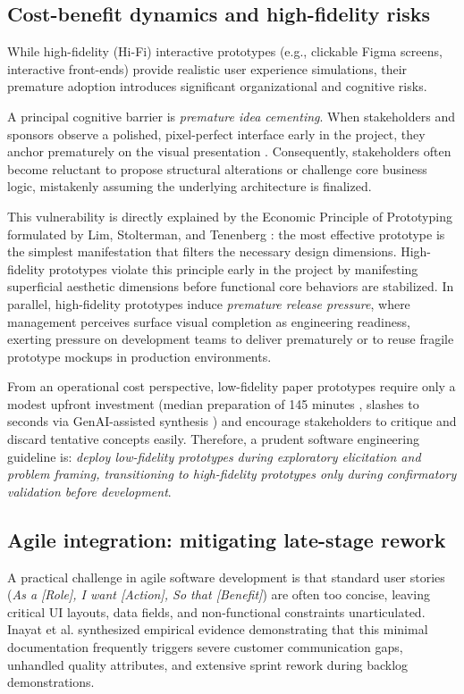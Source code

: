 \subsection{Cost-benefit dynamics and high-fidelity risks}
While high-fidelity (Hi-Fi) interactive prototypes (e.g., clickable Figma screens, interactive front-ends) provide realistic user experience simulations, their premature adoption introduces significant organizational and cognitive risks.

A principal cognitive barrier is \textit{premature idea cementing}. When stakeholders and sponsors observe a polished, pixel-perfect interface early in the project, they anchor prematurely on the visual presentation \cite{bjarnason2023empirically, gupta2022strategic}. Consequently, stakeholders often become reluctant to propose structural alterations or challenge core business logic, mistakenly assuming the underlying architecture is finalized.

This vulnerability is directly explained by the Economic Principle of Prototyping formulated by Lim, Stolterman, and Tenenberg \cite{lim2008anatomy}: the most effective prototype is the simplest manifestation that filters the necessary design dimensions. High-fidelity prototypes violate this principle early in the project by manifesting superficial aesthetic dimensions before functional core behaviors are stabilized. In parallel, high-fidelity prototypes induce \textit{premature release pressure}, where management perceives surface visual completion as engineering readiness, exerting pressure on development teams to deliver prematurely or to reuse fragile prototype mockups in production environments.

From an operational cost perspective, low-fidelity paper prototypes require only a modest upfront investment (median preparation of 145 minutes \cite{rueda2020requirements}, slashes to seconds via GenAI-assisted synthesis \cite{wei2023boosting}) and encourage stakeholders to critique and discard tentative concepts easily. Therefore, a prudent software engineering guideline is: \textit{deploy low-fidelity prototypes during exploratory elicitation and problem framing, transitioning to high-fidelity prototypes only during confirmatory validation before development}.

\subsection{Agile integration: mitigating late-stage rework}
A practical challenge in agile software development is that standard user stories (\textit{As a [Role], I want [Action], So that [Benefit]}) are often too concise, leaving critical UI layouts, data fields, and non-functional constraints unarticulated. Inayat et al. \cite{inayat2015systematic} synthesized empirical evidence demonstrating that this minimal documentation frequently triggers severe customer communication gaps, unhandled quality attributes, and extensive sprint rework during backlog demonstrations.

